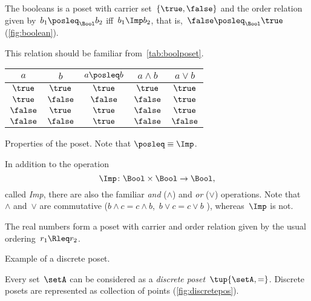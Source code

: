 \begin{example}[Booleans]
  \label{ex:bool}
  The booleans \index{\Bool} is a poset with carrier set~$\{\true,\false\}$ and the order relation given by~$b_1 \posleq_\Bool b_2$ iff~$b_1 \Imp b_2$, that is,~$\false \posleq_\Bool \true$ (\cref{fig:boolean}).


  This relation should be familiar from~\cref{tab:boolposet}.

  \begin{margintable}
    \centering
      \begin{tabular}{cc|ccc}
        $a$      & $b$      & $a \posleq  b$ & $a \wedge b$ & $a \vee b$ \\ \hline
        $\true$  & $\true$  & $\true$             & $\true$      & $\true$    \\
        $\true$  & $\false$ & $\false$            & $\false$     & $\true$    \\
        $\false$ & $\true$  & $\true$             & $\false$     & $\true$    \\
        $\false$ & $\false$ & $\true$             & $\false$     & $\false$
      \end{tabular}
    \caption{Properties of the \Bool poset. Note that $\posleq \equiv \Imp$.}
     \label{tab:boolposet}
  \end{margintable}

  In addition to the operation
  \begin{equation*}
    \Imp\colon\Bool\times \Bool\to\Bool,
  \end{equation*}
  called \emph{Imp}, there are also the familiar \emph{and} ($\wedge$) and \emph{or} ($\vee$) operations. Note that~$\wedge$ and~$\vee$ are commutative ($b\wedge c = c\wedge b$,~$b\vee c = c\vee b$ ), whereas~$\Imp$ is not.
\end{example}

\begin{example}[Reals]
  The real numbers \reals form a poset with carrier \reals and order relation given by the usual ordering~$r_1 \Rleq r_2$.
\end{example}

 \begin{marginfigure}
    \centering
    \caption{Example of a discrete poset.}
    \label{fig:discretepos}
  \end{marginfigure}

\begin{example}
  \label{ex:discreteposet}
  Every set~$\setA$ can be considered as a \emph{discrete poset}~$\tup{\setA,=}$.
  Discrete posets are represented as collection of points (\cref{fig:discretepos}).
\end{example}

